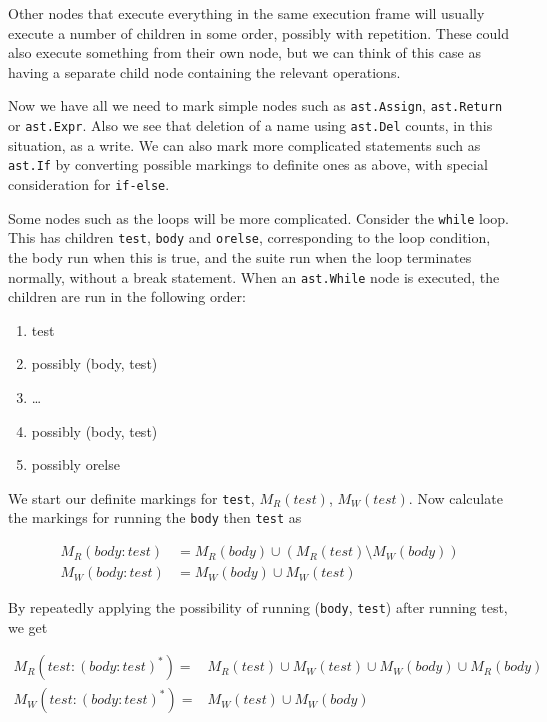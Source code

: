 \documentclass{report}
\begin{document}
Other nodes that execute everything in the same execution frame will usually execute a number of children in some order, possibly
with repetition. These could also execute something from their own node, but we can think of this case as having a separate child node containing
the relevant operations.

Now we have all we need to mark simple nodes such as \texttt{ast.Assign}, \texttt{ast.Return} or \texttt{ast.Expr}. Also we see that deletion of a name
using \texttt{ast.Del} counts, in this situation, as a write. We can also mark more complicated statements such as \texttt{ast.If} by converting
possible markings to definite ones as above, with special consideration for \texttt{if-else}.

Some nodes such as the loops will be more complicated. Consider the \texttt{while} loop. This has children \texttt{test}, \texttt{body} and \texttt{orelse},
corresponding to the loop condition, the body run when this is true, and the suite run when the loop terminates normally, without a break statement. When
an \texttt{ast.While} node is executed, the children are run in the following order:

\begin{enumerate}
\item test
\item possibly (body, test)
\item \ldots
\item possibly (body, test)
\item possibly orelse
\end{enumerate}

We start our definite markings for \texttt{test}, $M_R(test)$, $M_W(test)$. Now calculate the markings for running the \texttt{body} then \texttt{test} as

\begin{align*}
M_R(body : test) &= M_R(body) \cup (M_R(test) \setminus M_W(body)) \\
M_W(body : test) &= M_W(body) \cup M_W(test)
\end{align*}

By repeatedly applying the possibility of running (\texttt{body}, \texttt{test}) after running test, we get

\begin{align*}
M_R(test : (body : test)^*) =& M_R(test) \cup M_W(test) \cup M_W(body) \cup M_R(body) \\
M_W(test : (body : test)^*) =& M_W(test) \cup M_W(body)
\end{align*}
\end{document}
